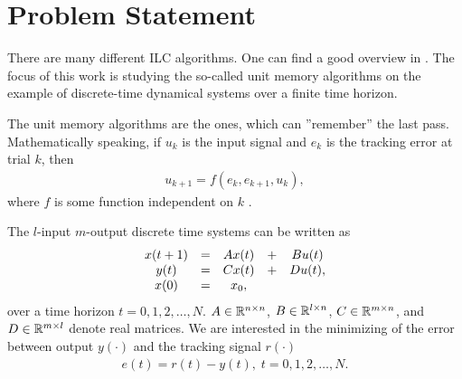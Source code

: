 \section{Problem Statement}


There are many different ILC algorithms. One can find a good overview in \cite{Bristov06}.
The focus of this work is studying the so-called unit memory algorithms on the example of discrete-time dynamical systems over a finite time horizon. 


The unit memory algorithms are the ones, which can ''remember'' the last pass. Mathematically speaking, if $u_k$ is the input signal and $e_k$ is the tracking error at trial $k$, then
\begin{align*}
u_{k+1} = f(e_k, e_{k+1}, u_k),
\end{align*}
where $f$ is some function independent on $k$ \cite{ILC}. 

The $l$-input $m$-output discrete time systems can be written as 
\begin{align*}
\begin{split}
&\begin{array}{c c c c c}
x(t+1) &= &A x(t)& + &B u(t)  \\
y ( t) &= &C x(t)&  + &D u(t),\\ 
x(0)& = &x_0, & &
\end{array}\\
\end{split}
\end{align*}
over a time horizon $t = 0, 1, 2, \dots, N$. $A \in {\mathbb{R}}^{n \times n}$, $B\in {\mathbb{R}}^{l \times n}$, $C \in {\mathbb{R}}^{m \times n}$, and $D\in {\mathbb{R}}^{m \times l}$ denote  real matrices.
We are interested in the minimizing of the error between output $y(\cdot)$ and the tracking signal $r(\cdot)$
\begin{align*}
e(t) = r(t) - y(t), \; t  = 0, 1, 2, \dots, N. 
\end{align*}

